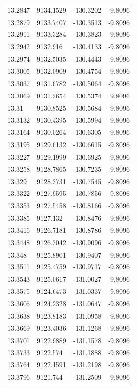 \begin{table}[H]
\begin{tabular}{llll}
13.2847 & 9134.1529 & -130.3202 & -9.8096 \\
13.2879 & 9133.7407 & -130.3513 & -9.8096 \\
13.2911 & 9133.3284 & -130.3823 & -9.8096 \\
13.2942 & 9132.916 & -130.4133 & -9.8096 \\
13.2974 & 9132.5035 & -130.4443 & -9.8096 \\
13.3005 & 9132.0909 & -130.4754 & -9.8096 \\
13.3037 & 9131.6782 & -130.5064 & -9.8096 \\
13.3069 & 9131.2654 & -130.5374 & -9.8096 \\
13.31 & 9130.8525 & -130.5684 & -9.8096 \\
13.3132 & 9130.4395 & -130.5994 & -9.8096 \\
13.3164 & 9130.0264 & -130.6305 & -9.8096 \\
13.3195 & 9129.6132 & -130.6615 & -9.8096 \\
13.3227 & 9129.1999 & -130.6925 & -9.8096 \\
13.3258 & 9128.7865 & -130.7235 & -9.8096 \\
13.329 & 9128.3731 & -130.7545 & -9.8096 \\
13.3322 & 9127.9595 & -130.7856 & -9.8096 \\
13.3353 & 9127.5458 & -130.8166 & -9.8096 \\
13.3385 & 9127.132 & -130.8476 & -9.8096 \\
13.3416 & 9126.7181 & -130.8786 & -9.8096 \\
13.3448 & 9126.3042 & -130.9096 & -9.8096 \\
13.348 & 9125.8901 & -130.9407 & -9.8096 \\
13.3511 & 9125.4759 & -130.9717 & -9.8096 \\
13.3543 & 9125.0617 & -131.0027 & -9.8096 \\
13.3575 & 9124.6473 & -131.0337 & -9.8096 \\
13.3606 & 9124.2328 & -131.0647 & -9.8096 \\
13.3638 & 9123.8183 & -131.0958 & -9.8096 \\
13.3669 & 9123.4036 & -131.1268 & -9.8096 \\
13.3701 & 9122.9889 & -131.1578 & -9.8096 \\
13.3733 & 9122.574 & -131.1888 & -9.8096 \\
13.3764 & 9122.1591 & -131.2198 & -9.8096 \\
13.3796 & 9121.744 & -131.2509 & -9.8096 \\

\end{tabular}
\end{table}
